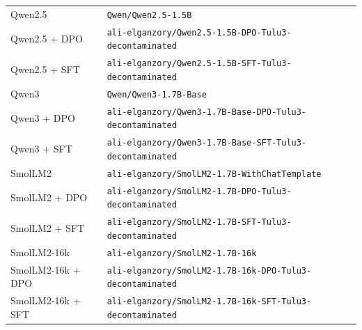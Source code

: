 \begin{table}[ht]
\begin{tabular}{lp{10cm}}
Qwen2.5 & \texttt{Qwen/\allowbreak{}Qwen2.5-\allowbreak{}1.5B} \\
Qwen2.5 + DPO & \texttt{ali-\allowbreak{}elganzory/\allowbreak{}Qwen2.5-\allowbreak{}1.5B-\allowbreak{}DPO-\allowbreak{}Tulu3-\allowbreak{}decontaminated} \\
Qwen2.5 + SFT & \texttt{ali-\allowbreak{}elganzory/\allowbreak{}Qwen2.5-\allowbreak{}1.5B-\allowbreak{}SFT-\allowbreak{}Tulu3-\allowbreak{}decontaminated} \\
Qwen3 & \texttt{Qwen/\allowbreak{}Qwen3-\allowbreak{}1.7B-\allowbreak{}Base} \\
Qwen3 + DPO & \texttt{ali-\allowbreak{}elganzory/\allowbreak{}Qwen3-\allowbreak{}1.7B-\allowbreak{}Base-\allowbreak{}DPO-\allowbreak{}Tulu3-\allowbreak{}decontaminated} \\
Qwen3 + SFT & \texttt{ali-\allowbreak{}elganzory/\allowbreak{}Qwen3-\allowbreak{}1.7B-\allowbreak{}Base-\allowbreak{}SFT-\allowbreak{}Tulu3-\allowbreak{}decontaminated} \\
SmolLM2 & \texttt{ali-\allowbreak{}elganzory/\allowbreak{}SmolLM2-\allowbreak{}1.7B-\allowbreak{}WithChatTemplate} \\
SmolLM2 + DPO & \texttt{ali-\allowbreak{}elganzory/\allowbreak{}SmolLM2-\allowbreak{}1.7B-\allowbreak{}DPO-\allowbreak{}Tulu3-\allowbreak{}decontaminated} \\
SmolLM2 + SFT & \texttt{ali-\allowbreak{}elganzory/\allowbreak{}SmolLM2-\allowbreak{}1.7B-\allowbreak{}SFT-\allowbreak{}Tulu3-\allowbreak{}decontaminated} \\
SmolLM2-16k & \texttt{ali-\allowbreak{}elganzory/\allowbreak{}SmolLM2-\allowbreak{}1.7B-\allowbreak{}16k} \\
SmolLM2-16k + DPO & \texttt{ali-\allowbreak{}elganzory/\allowbreak{}SmolLM2-\allowbreak{}1.7B-\allowbreak{}16k-\allowbreak{}DPO-\allowbreak{}Tulu3-\allowbreak{}decontaminated} \\
SmolLM2-16k + SFT & \texttt{ali-\allowbreak{}elganzory/\allowbreak{}SmolLM2-\allowbreak{}1.7B-\allowbreak{}16k-\allowbreak{}SFT-\allowbreak{}Tulu3-\allowbreak{}decontaminated} \\
\bottomrule
\end{tabular}
\end{table}
